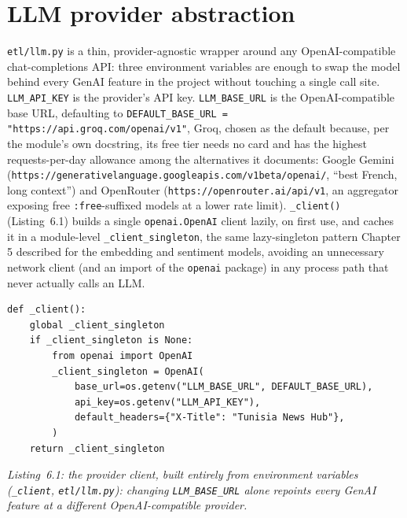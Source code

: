 \section{LLM provider abstraction}
\label{sec:llm-provider}
\begin{sloppypar}
\texttt{etl/llm.py} is a thin, provider-agnostic wrapper around any OpenAI-compatible chat-completions API: three environment variables are enough to swap the model behind every GenAI feature in the project without touching a single call site. \texttt{LLM\_API\_KEY} is the provider's API key. \texttt{LLM\_BASE\_URL} is the OpenAI-compatible base URL, defaulting to \texttt{DEFAULT\_BASE\_URL = "https://\allowbreak api.groq.com/\allowbreak openai/v1"}, Groq, chosen as the default because, per the module's own docstring, its free tier needs no card and has the highest requests-per-day allowance among the alternatives it documents: Google Gemini (\texttt{https://\allowbreak generativelanguage.\allowbreak googleapis.com/\allowbreak v1beta/openai/}, ``best French, long context'') and OpenRouter (\texttt{https://\allowbreak openrouter.ai/\allowbreak api/v1}, an aggregator exposing free \texttt{:free}-suffixed models at a lower rate limit). \texttt{\_client()} (Listing~6.1) builds a single \texttt{openai.OpenAI} client lazily, on first use, and caches it in a module-level \texttt{\_client\_singleton}, the same lazy-singleton pattern Chapter 5 described for the embedding and sentiment models, avoiding an unnecessary network client (and an import of the \texttt{openai} package) in any process path that never actually calls an LLM.
\end{sloppypar}

\begin{verbatim}
def _client():
    global _client_singleton
    if _client_singleton is None:
        from openai import OpenAI
        _client_singleton = OpenAI(
            base_url=os.getenv("LLM_BASE_URL", DEFAULT_BASE_URL),
            api_key=os.getenv("LLM_API_KEY"),
            default_headers={"X-Title": "Tunisia News Hub"},
        )
    return _client_singleton
\end{verbatim}
\begin{center}
\textit{Listing~6.1: the provider client, built entirely from environment variables (\texttt{\_client}, \texttt{etl/llm.py}): changing \texttt{LLM\_BASE\_URL} alone repoints every GenAI feature at a different OpenAI-compatible provider.}
\end{center}

